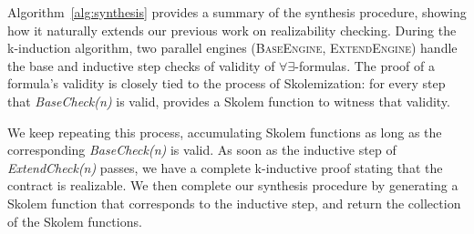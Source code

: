 
Algorithm~\ref{alg:synthesis} provides a summary of the synthesis
procedure, showing how it naturally extends our previous work on
realizability checking. During the k-induction algorithm, two parallel
engines (\textsc{BaseEngine, ExtendEngine}) handle the base and
inductive step checks of validity of $\forall\exists$-formulas. The
proof of a formula's validity is closely tied to the process of
Skolemization: for every step that \textit{BaseCheck(n)} is valid, \aeval
provides a Skolem function to witness that validity.

We keep repeating this process, accumulating Skolem functions
as long as the corresponding \textit{BaseCheck(n)} is valid. As soon
as the inductive step of \textit{ExtendCheck(n)} passes, we have a
complete k-inductive proof stating that the contract is realizable. We
then complete our synthesis procedure by generating a Skolem function
that corresponds to the inductive step, and return the collection of
the Skolem functions.

